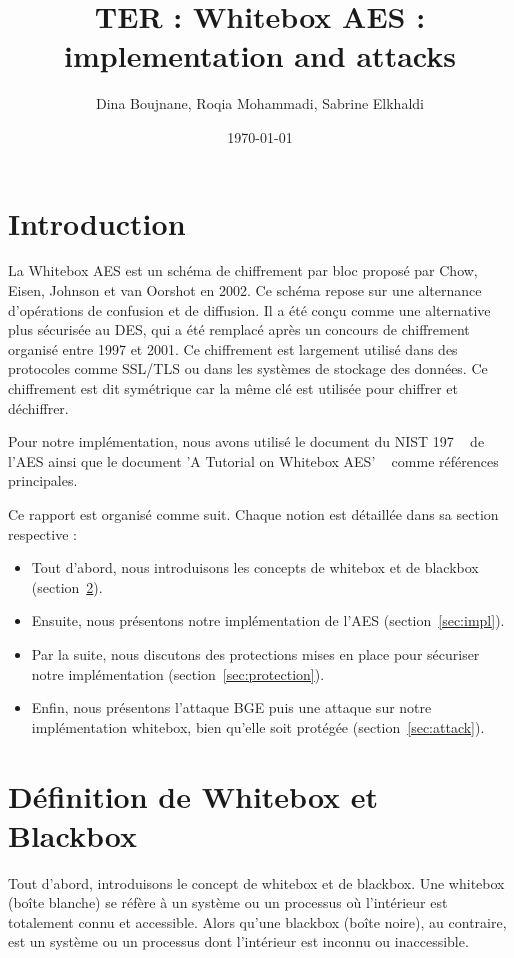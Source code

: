 \documentclass[a4paper, 10pt]{article}
\begin{document}
  \title{TER : Whitebox AES : implementation and attacks}
  \author{Dina Boujnane, Roqia Mohammadi, Sabrine Elkhaldi}
  \date{\today}
  \maketitle
  \tableofcontents
  \newpage

  \section{Introduction}
  La Whitebox AES est un schéma de chiffrement par bloc proposé par Chow, Eisen, 
  Johnson et van Oorshot en 2002. Ce schéma repose sur une alternance 
  d'opérations de confusion et de diffusion. Il a été conçu comme une alternative 
  plus sécurisée au DES, qui a été remplacé après un concours de chiffrement organisé entre 1997 et 2001.
  Ce chiffrement est largement utilisé dans des protocoles comme SSL/TLS 
  ou dans les systèmes de stockage des données. Ce chiffrement est dit symétrique car la même clé 
  est utilisée pour chiffrer et déchiffrer. 
  
  \indent Pour notre implémentation, nous avons utilisé le document du NIST 197 ~\cite{key} de l'AES ainsi que le document 
  'A Tutorial on Whitebox AES' ~\cite{key1} comme références principales.

  Ce rapport est organisé comme suit. Chaque notion est détaillée dans sa section respective :
  \begin{itemize}
    \item Tout d'abord, nous introduisons les concepts de whitebox et de blackbox (section~\ref{sec:whitebox_blackbox}).
    \item Ensuite, nous présentons notre implémentation de l'AES (section~\ref{sec:impl}).
    \item Par la suite, nous discutons des protections mises en place pour sécuriser notre implémentation (section~\ref{sec:protection}).
    \item Enfin, nous présentons l'attaque BGE puis une attaque sur notre implémentation whitebox, bien qu'elle soit protégée (section~\ref{sec:attack}).
  \end{itemize}  

  \section{Définition de Whitebox et Blackbox}
  \label{sec:whitebox_blackbox}
  \indent Tout d'abord, introduisons le concept de whitebox et de blackbox. Une whitebox (boîte blanche) 
  se réfère à un système ou un processus où l'intérieur est totalement connu et accessible. 
  Alors qu'une blackbox (boîte noire), au contraire, est un système ou un processus dont 
  l'intérieur est inconnu ou inaccessible.
\end{document}
